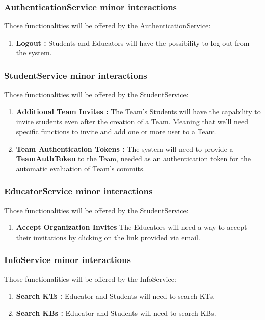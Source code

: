 \documentclass[11pt]{report}
\begin{document}
\subsubsection{AuthenticationService minor interactions}
Those functionalities will be offered by the AuthenticationService:
\begin{enumerate}
    \item \textbf{Logout :} Students and Educators will have the possibility to log out from the system.
\end{enumerate}

\subsubsection{StudentService minor interactions}
Those functionalities will be offered by the StudentService:
\begin{enumerate}
    \item \textbf{Additional Team Invites :} The Team's Students will have the capability to invite students even after the creation of a Team.
    Meaning that we'll need specific functions to invite and add one or more user to a Team.
    \item \textbf{Team Authentication Tokens :} The system will need to provide a \textbf{TeamAuthToken} to the Team, needed as an authentication token for the automatic evaluation of Team's commits.
\end{enumerate}

\subsubsection{EducatorService minor interactions}
Those functionalities will be offered by the StudentService:
\begin{enumerate}
    \item \textbf{Accept Organization Invites} The Educators will need a way to accept their invitations by clicking on the link provided via email.
\end{enumerate}

\subsubsection{InfoService minor interactions}
Those functionalities will be offered by the InfoService:
\begin{enumerate}
    \item \textbf{Search KTs :} Educator and Students will need to search KTs.
    \item \textbf{Search KBs :} Educator and Students will need to search KBs.
\end{enumerate}
\end{document}
